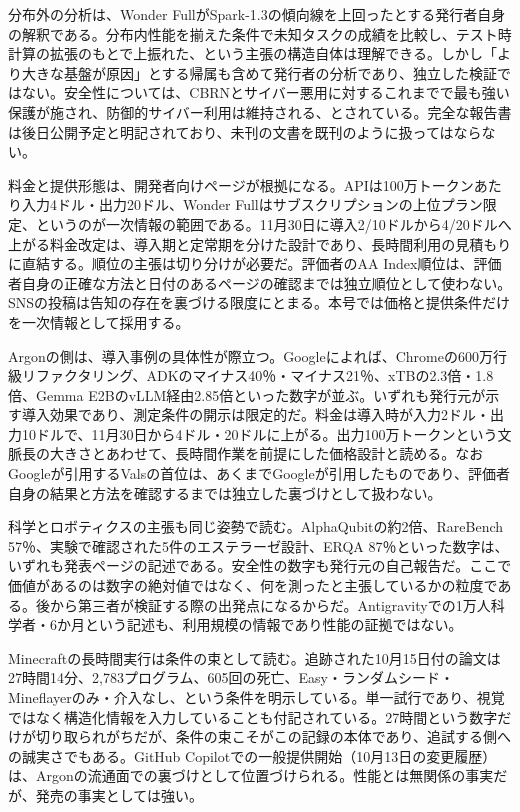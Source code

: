 \documentclass[lualatex,a4paper,10pt]{jlreq}
\begin{document}
分布外の分析は、Wonder FullがSpark-1.3の傾向線を上回ったとする発行者自身の解釈である。分布内性能を揃えた条件で未知タスクの成績を比較し、テスト時計算の拡張のもとで上振れた、という主張の構造自体は理解できる。しかし「より大きな基盤が原因」とする帰属も含めて発行者の分析であり、独立した検証ではない。安全性については、CBRNとサイバー悪用に対するこれまでで最も強い保護が施され、防御的サイバー利用は維持される、とされている。完全な報告書は後日公開予定と明記されており、未刊の文書を既刊のように扱ってはならない。
\cite{B01,B04,B07}


料金と提供形態は、開発者向けページが根拠になる。APIは100万トークンあたり入力4ドル・出力20ドル、Wonder Fullはサブスクリプションの上位プラン限定、というのが一次情報の範囲である。11月30日に導入2/10ドルから4/20ドルへ上がる料金改定は、導入期と定常期を分けた設計であり、長時間利用の見積もりに直結する。順位の主張は切り分けが必要だ。評価者のAA Index順位は、評価者自身の正確な方法と日付のあるページの確認までは独立順位として使わない。SNSの投稿は告知の存在を裏づける限度にとまる。本号では価格と提供条件だけを一次情報として採用する。
\cite{B01,B02,B03,B04,B05,B06,B07,B08}


Argonの側は、導入事例の具体性が際立つ。Googleによれば、Chromeの600万行級リファクタリング、ADKのマイナス40％・マイナス21％、xTBの2.3倍・1.8倍、Gemma E2BのvLLM経由2.85倍といった数字が並ぶ。いずれも発行元が示す導入効果であり、測定条件の開示は限定的だ。料金は導入時が入力2ドル・出力10ドルで、11月30日から4ドル・20ドルに上がる。出力100万トークンという文脈長の大きさとあわせて、長時間作業を前提にした価格設計と読める。なおGoogleが引用するValsの首位は、あくまでGoogleが引用したものであり、評価者自身の結果と方法を確認するまでは独立した裏づけとして扱わない。
\cite{B02,B03,B05,B06,B08}


科学とロボティクスの主張も同じ姿勢で読む。AlphaQubitの約2倍、RareBench 57％、実験で確認された5件のエステラーゼ設計、ERQA 87％といった数字は、いずれも発表ページの記述である。安全性の数字も発行元の自己報告だ。ここで価値があるのは数字の絶対値ではなく、何を測ったと主張しているかの粒度である。後から第三者が検証する際の出発点になるからだ。Antigravityでの1万人科学者・6か月という記述も、利用規模の情報であり性能の証拠ではない。
\cite{B02,B03,B05,B06,B08}


Minecraftの長時間実行は条件の束として読む。追跡された10月15日付の論文は27時間14分、2,783プログラム、605回の死亡、Easy・ランダムシード・Mineflayerのみ・介入なし、という条件を明示している。単一試行であり、視覚ではなく構造化情報を入力していることも付記されている。27時間という数字だけが切り取られがちだが、条件の束こそがこの記録の本体であり、追試する側への誠実さでもある。GitHub Copilotでの一般提供開始（10月13日の変更履歴）は、Argonの流通面での裏づけとして位置づけられる。性能とは無関係の事実だが、発売の事実としては強い。
\cite{B02,B03,B05,B06,B08}
\end{document}
